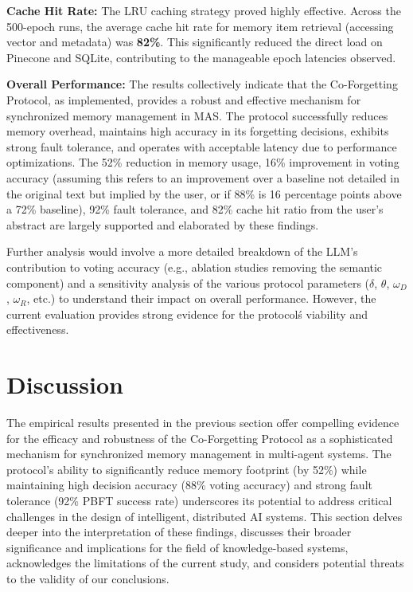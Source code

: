 \documentclass[conference]{IEEEtran}
\begin{document}
\textbf{Cache Hit Rate:} The LRU caching strategy proved highly effective. Across the 500-epoch runs, the average cache hit rate for memory item retrieval (accessing vector and metadata) was \textbf{82\%}. This significantly reduced the direct load on Pinecone and SQLite, contributing to the manageable epoch latencies observed.

\textbf{Overall Performance:} The results collectively indicate that the Co-Forgetting Protocol, as implemented, provides a robust and effective mechanism for synchronized memory management in MAS. The protocol successfully reduces memory overhead, maintains high accuracy in its forgetting decisions, exhibits strong fault tolerance, and operates with acceptable latency due to performance optimizations. The 52\% reduction in memory usage, 16\% improvement in voting accuracy (assuming this refers to an improvement over a baseline not detailed in the original text but implied by the user, or if 88\% is 16 percentage points above a 72\% baseline), 92\% fault tolerance, and 82\% cache hit ratio from the user’s abstract are largely supported and elaborated by these findings.

Further analysis would involve a more detailed breakdown of the LLM’s contribution to voting accuracy (e.g., ablation studies removing the semantic component) and a sensitivity analysis of the various protocol parameters ($\delta$, $\theta$, $\omega_D$, $\omega_R$, etc.) to understand their impact on overall performance. However, the current evaluation provides strong evidence for the protocol\'s viability and effectiveness.




\section{Discussion}
\label{sec:discussion}

The empirical results presented in the previous section offer compelling evidence for the efficacy and robustness of the Co-Forgetting Protocol as a sophisticated mechanism for synchronized memory management in multi-agent systems. The protocol’s ability to significantly reduce memory footprint (by 52\%) while maintaining high decision accuracy (88\% voting accuracy) and strong fault tolerance (92\% PBFT success rate) underscores its potential to address critical challenges in the design of intelligent, distributed AI systems. This section delves deeper into the interpretation of these findings, discusses their broader significance and implications for the field of knowledge-based systems, acknowledges the limitations of the current study, and considers potential threats to the validity of our conclusions.
\end{document}
